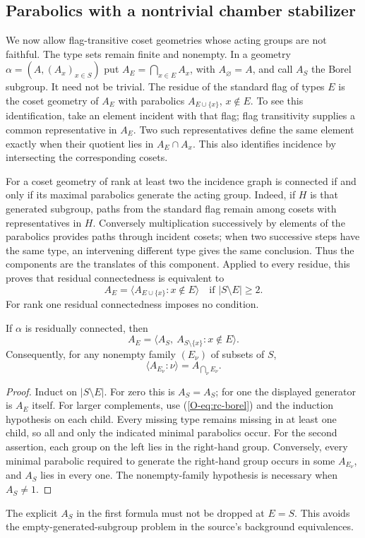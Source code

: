 \subsection{Parabolics with a nontrivial chamber stabilizer}
We now allow flag-transitive coset geometries whose acting groups are not
faithful. The type sets remain finite and nonempty. In a geometry
$\alpha=(A,(A_x)_{x\in S})$ put $A_E=\bigcap_{x\in E}A_x$, with
$A_\varnothing=A$, and call $A_S$ the Borel subgroup. It need not be
trivial. The residue of the standard flag of types $E$ is the coset
geometry of $A_E$ with parabolics $A_{E\cup\{x\}}$, $x\notin E$.
To see this identification, take an element incident with that flag;
flag transitivity supplies a common representative in $A_E$. Two such
representatives define the same element exactly when their quotient
lies in $A_E\cap A_x$. This also identifies incidence by intersecting
the corresponding cosets.

For a coset geometry of rank at least two the incidence graph is
connected if and only if its maximal parabolics generate the acting
group. Indeed, if $H$ is that generated subgroup, paths from the
standard flag remain among cosets with representatives in $H$.
Conversely multiplication successively by elements of the parabolics
provides paths through incident cosets; when two successive steps have
the same type, an intervening different type gives the same conclusion.
Thus the components are the translates of this component. Applied to
every residue, this proves that residual connectedness is equivalent to
\begin{equation}\label{O-eq:rc-borel}
 A_E=\langle A_{E\cup\{x\}}:x\notin E\rangle
 \quad\text{if }|S\setminus E|\geq2.
\end{equation}
For rank one residual connectedness imposes no condition.

\begin{lemma}\label{O-lem:parabolic-join}
If $\alpha$ is residually connected, then
\[
 A_E=\langle A_S,\ A_{S\setminus\{x\}}:x\notin E\rangle.
\]
Consequently, for any nonempty family $(E_\nu)$ of subsets of $S$,
\begin{equation}\label{O-eq:parabolic-join}
 \langle A_{E_\nu}:\nu\rangle=A_{\bigcap_\nu E_\nu}.
\end{equation}
\end{lemma}
\begin{proof}
Induct on $|S\setminus E|$. For zero this is $A_S=A_S$; for one
the displayed generator is $A_E$ itself. For larger complements,
use (\ref{O-eq:rc-borel}) and the induction hypothesis on each child.
Every missing type remains missing in at least one child, so all and
only the indicated minimal parabolics occur. For the second assertion,
each group on the left lies in the right-hand group. Conversely, every
minimal parabolic required to generate the right-hand group occurs
in some $A_{E_\nu}$, and $A_S$ lies in every one. The nonempty-family
hypothesis is necessary when $A_S\ne1$.
\end{proof}
The explicit $A_S$ in the first formula must not be dropped at
$E=S$. This avoids the empty-generated-subgroup problem in the
source's background equivalences.
